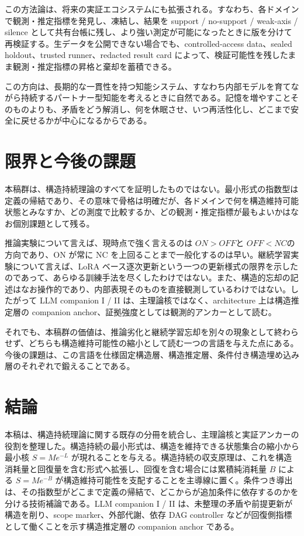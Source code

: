 \documentclass[12pt,a4paper]{article}
\begin{document}
この方法論は、将来の実証エコシステムにも拡張される。すなわち、各ドメインで観測・推定指標を発見し、凍結し、結果を support / no-support / weak-axis / silence として共有台帳に残し、より強い測定が可能になったときに版を分けて再検証する。生データを公開できない場合でも、controlled-access data、sealed holdout、trusted runner、redacted result card によって、検証可能性を残したまま観測・推定指標の昇格と棄却を蓄積できる。

この方向は、長期的な一貫性を持つ知能システム、すなわち内部モデルを育てながら持続するパートナー型知能を考えるときに自然である。記憶を増やすことそのものよりも、矛盾をどう解消し、何を休眠させ、いつ再活性化し、どこまで安全に戻せるかが中心になるからである。

\section{限界と今後の課題}\label{ux9650ux754cux3068ux4ecaux5f8cux306eux8ab2ux984c}

本稿群は、構造持続理論のすべてを証明したものではない。最小形式の指数型は定義の帰結であり、その意味で骨格は明確だが、各ドメインで何を構造維持可能状態とみなすか、どの測度で比較するか、どの観測・推定指標が最もよいかはなお個別課題として残る。

推論実験について言えば、現時点で強く言えるのは \(ON > OFF\)と \(OFF < NC\)の方向であり、ON が常に NC を上回ることまで一般化するのは早い。継続学習実験について言えば、LoRA ベース逐次更新という一つの更新様式の限界を示したのであって、あらゆる訓練手法を尽くしたわけではない。また、構造的忘却の記述はなお操作的であり、内部表現そのものを直接観測しているわけではない。したがって LLM companion I / II は、主理論核ではなく、architecture 上は構造推定層の companion anchor、証拠強度としては観測的アンカーとして読む。

それでも、本稿群の価値は、推論劣化と継続学習忘却を別々の現象として終わらせず、どちらも構造維持可能性の縮小として読む一つの言語を与えた点にある。今後の課題は、この言語を仕様固定構造層、構造推定層、条件付き構造埋め込み層のそれぞれで鍛えることである。

\section{結論}\label{ux7d50ux8ad6}

本稿は、構造持続理論に関する既存の分冊を統合し、主理論核と実証アンカーの役割を整理した。構造持続の最小形式は、構造を維持できる状態集合の縮小から最小核 \(S=Me^{-L}\) が現れることを与える。構造持続の収支原理は、これを構造消耗量と回復量を含む形式へ拡張し、回復を含む場合には累積純消耗量 \(B\) による \(S=Me^{-B}\) が構造維持可能性を支配することを主導線に置く。条件つき導出は、その指数型がどこまで定義の帰結で、どこからが追加条件に依存するのかを分ける技術補論である。LLM companion I / II は、未整理の矛盾や前提更新が構造を削り、scope marker、外部代謝、依存 DAG controller などが回復側指標として働くことを示す構造推定層の companion anchor である。
\end{document}
